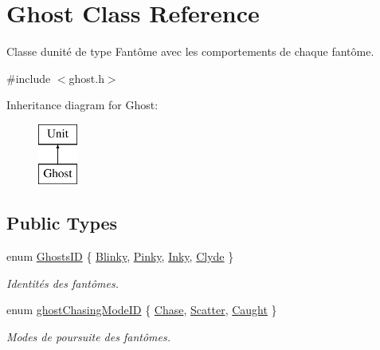 \hypertarget{class_ghost}{}\section{Ghost Class Reference}
\label{class_ghost}


Classe d\textquotesingle{}unité de type Fantôme avec les comportements de chaque fantôme.  




{\ttfamily \#include $<$ghost.\+h$>$}

Inheritance diagram for Ghost\+:\begin{figure}[H]
\begin{center}
\leavevmode
\includegraphics[height=2.000000cm]{class_ghost}
\end{center}
\end{figure}
\subsection*{Public Types}
\begin{DoxyCompactItemize}
\item 
enum \hyperlink{class_ghost_adc8bee2d77e1ca0e4999cace773c71dd}{Ghosts\+I\+D} \{ \hyperlink{class_ghost_adc8bee2d77e1ca0e4999cace773c71dda41f01d04777c489d40e34d6c058c6b5b}{Blinky}, 
\hyperlink{class_ghost_adc8bee2d77e1ca0e4999cace773c71ddac04d44f7968750d812d98cb2b3699cb5}{Pinky}, 
\hyperlink{class_ghost_adc8bee2d77e1ca0e4999cace773c71dda1e770e10aa3bb3f14728210ec28ccf0c}{Inky}, 
\hyperlink{class_ghost_adc8bee2d77e1ca0e4999cace773c71dda28364f0ec8546ed1dea16de59696ab12}{Clyde}
 \}\begin{DoxyCompactList}\small\item\em Identités des fantômes. \end{DoxyCompactList}
\item 
enum \hyperlink{class_ghost_a95bc4313fdf87d827c64fe9607fcc205}{ghost\+Chasing\+Mode\+I\+D} \{ \hyperlink{class_ghost_a95bc4313fdf87d827c64fe9607fcc205a4e0f748a4d226742a8d524f8386fc6db}{Chase}, 
\hyperlink{class_ghost_a95bc4313fdf87d827c64fe9607fcc205a49e7cffc44104e0f3f65579a25804b63}{Scatter}, 
\hyperlink{class_ghost_a95bc4313fdf87d827c64fe9607fcc205ae7975f0b636e971a50a0a4285353ac0e}{Caught}
 \}\begin{DoxyCompactList}\small\item\em Modes de poursuite des fantômes. \end{DoxyCompactList}
\end{DoxyCompactItemize}
